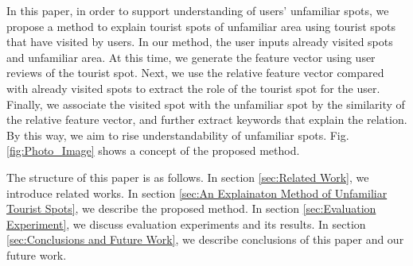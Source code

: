 \documentclass[journal]{IAENGtran}
\begin{document}
In this paper, in order to support understanding of users' unfamiliar spots, we propose a method to explain tourist spots of unfamiliar area using tourist spots that have visited by users.
In our method, the user inputs already visited spots and unfamiliar area.
At this time, we generate the feature vector using user reviews of the tourist spot.
Next, we use the relative feature vector compared with already visited spots to extract the role of the tourist spot for the user.
Finally, we associate the visited spot with the unfamiliar spot by the similarity of the relative feature vector, and further extract keywords that explain the relation.
By this way, we aim to rise understandability of unfamiliar spots.
Fig. \ref{fig:Photo_Image} shows a concept of the proposed method.

The structure of this paper is as follows.
In section \ref{sec:Related Work}, we introduce related works.
In section \ref{sec:An Explainaton Method of Unfamiliar Tourist Spots}, we describe the proposed method.
In section \ref{sec:Evaluation Experiment}, we discuss evaluation experiments and its results.
In section \ref{sec:Conclusions and Future Work}, we describe conclusions of this paper and our future work.
\end{document}
